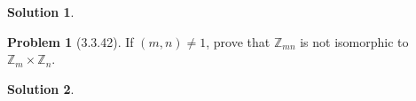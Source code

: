 \documentclass[12pt]{article}
\theoremstyle{definition}
\newtheorem*{prob}{Problem}
\newtheorem*{soln}{Solution}
\newcommand{\ZZ}{{\mathbb{Z}}}
\begin{document}
\begin{soln}

\end{soln}


\begin{prob}[3.3.42]
If  $(m, n) \neq 1$, prove that $\ZZ_{mn}$ is not isomorphic to $\ZZ_m \times \ZZ_n$.
\end{prob}

\begin{soln}

\end{soln}
\end{document}
